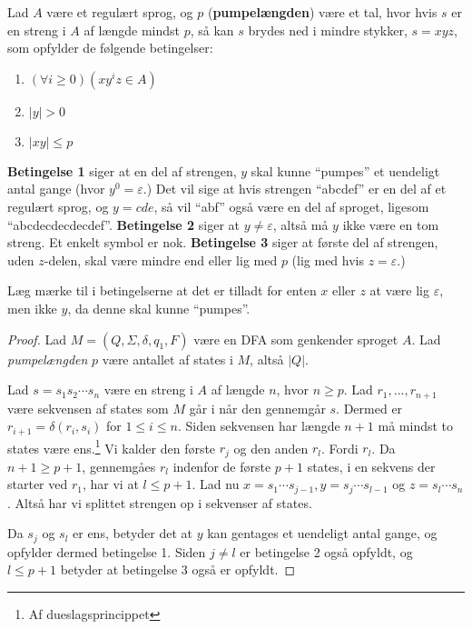 \begin{theorem}[Pumpelemmaet]
  \label{the:pumpelemma}
  Lad $A$ være et regulært sprog, og $p$ (\textbf{pumpelængden}) være et tal, hvor hvis $s$ er en streng i $A$ af længde mindst $p$, så kan $s$ brydes ned i mindre stykker, $s = xyz$, som opfylder de følgende betingelser:
  \begin{enumerate}
    \item $(\forall i \geq 0)(xy^{i}z \in A)$
    \item $|y| > 0$
    \item $|xy| \leq p$
  \end{enumerate}
\end{theorem}

\textbf{Betingelse 1} siger at en del af strengen, $y$ skal kunne ``pumpes'' et uendeligt antal gange (hvor $y^{0} = \varepsilon$.) Det vil sige at hvis strengen ``abcdef'' er en del af et regulært sprog, og $y = cde$, så vil ``abf'' også være en del af sproget, ligesom ``abcdecdecdecdef''.
\textbf{Betingelse 2} siger at $y \neq \varepsilon$, altså må $y$ ikke være en tom streng. Et enkelt symbol er nok.
\textbf{Betingelse 3} siger at første del af strengen, uden $z$-delen, skal være mindre end eller lig med $p$ (lig med hvis $z = \varepsilon$.)

Læg mærke til i betingelserne at det er tilladt for enten $x$ eller $z$ at være lig $\varepsilon$, men ikke $y$, da denne skal kunne ``pumpes''.

\begin{proof}
  Lad $M = (Q, \Sigma, \delta, q_{1}, F)$ være en DFA som genkender sproget $A$. Lad \textit{pumpelængden} $p$ være antallet af states i $M$, altså $|Q|$.

  Lad $s = s_{1}s_{2} \cdots s_{n}$ være en streng i $A$ af længde $n$, hvor $n \geq p$. Lad $r_{1}, \ldots, r_{n+1}$ være sekvensen af states som $M$ går i når den gennemgår $s$. Dermed er $r_{i+1} = \delta(r_i, s_{i})$ for $1 \leq i \leq n$. Siden sekvensen har længde $n+1$ må mindst to states være ens.\footnote{Af dueslagsprincippet} Vi kalder den første $r_{j}$ og den anden $r_{l}$. Fordi $r_{l}$. Da $n+1 \geq p+1$, gennemgåes $r_{l}$ indenfor de første $p+1$ states, i en sekvens der starter ved $r_{1}$, har vi at $l \leq p+1$. Lad nu $x = s_{1} \cdots s_{j-1}, y = s_{j} \cdots s_{l-1}$ og $z = s_{l} \cdots s_{n}$. Altså har vi splittet strengen op i sekvenser af states.

  Da $s_{j}$ og $s_{l}$ er ens, betyder det at $y$ kan gentages et uendeligt antal gange, og opfylder dermed betingelse 1. Siden $j \neq l$ er betingelse 2 også opfyldt, og $l \leq p+1$ betyder at betingelse 3 også er opfyldt.
\end{proof}


